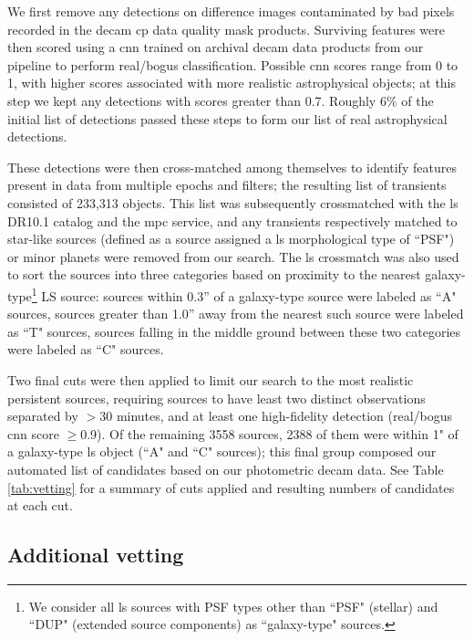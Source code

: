 \documentclass[twocolumn]{aastex631}
\begin{document}
We first remove any detections on difference images contaminated by bad pixels recorded in the \gls{decam} \gls{cp} data quality mask products.
Surviving features were then scored using a \gls{cnn} trained on archival \gls{decam} data products from our pipeline to perform real/bogus classification.
Possible \gls{cnn} scores range from 0 to 1, with higher scores associated with more realistic astrophysical objects; at this step we kept any detections with scores greater than 0.7.
Roughly 6\% of the initial list of detections passed these steps to form our list of real astrophysical detections.

These detections were then cross-matched among themselves to identify features present in data from multiple epochs and filters; the resulting list of transients consisted of 233,313 objects.
This list was subsequently crossmatched with the \gls{ls} DR10.1 catalog \citep{Dey2019} and the \gls{mpc} service, and any transients respectively matched to star-like sources (defined as a source assigned a \gls{ls} morphological type of ``PSF") or minor planets were removed from our search.
The \gls{ls} crossmatch was also used to sort the sources into three categories based on proximity to the nearest galaxy-type\footnote{We consider all \gls{ls} sources with PSF types other than ``PSF" (stellar) and ``DUP" (extended source components) as ``galaxy-type" sources.} LS source: sources within 0.3” of a galaxy-type source were labeled as ``A" sources,
sources greater than 1.0” away from the nearest such source were labeled as ``T" sources, sources falling in the middle ground between these two categories were labeled as ``C" sources.

Two final cuts were then applied to limit our search to the most realistic persistent sources, requiring sources to have least two distinct observations separated by $>$30 minutes, and at least one high-fidelity detection (real/bogus \gls{cnn} score $\ge$0.9).
Of the remaining 3558 sources, 2388 of them were within 1" of a galaxy-type \gls{ls} object (``A" and ``C" sources); this final group composed our automated list of candidates based on our photometric \gls{decam} data.
See Table \ref{tab:vetting} for a summary of cuts applied and resulting numbers of candidates at each cut.

\subsection{Additional vetting} %
\label{subsec:handsvet}
\end{document}
